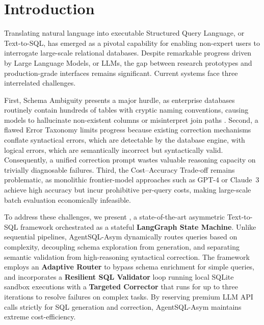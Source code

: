 \section{Introduction}
\label{sec:intro}

Translating natural language into executable Structured Query Language, or Text-to-SQL, has emerged as a pivotal capability for enabling non-expert users to interrogate large-scale relational databases. Despite remarkable progress driven by Large Language Models, or LLMs, the gap between research prototypes and production-grade interfaces remains significant. Current systems face three interrelated challenges.

First, Schema Ambiguity presents a major hurdle, as enterprise databases routinely contain hundreds of tables with cryptic naming conventions, causing models to hallucinate non-existent columns or misinterpret join paths \cite{li_can_2023, floratou2024broken}. Second, a flawed Error Taxonomy limits progress because existing correction mechanisms conflate syntactical errors, which are detectable by the database engine, with logical errors, which are semantically incorrect but syntactically valid. Consequently, a unified correction prompt wastes valuable reasoning capacity on trivially diagnosable failures. Third, the Cost--Accuracy Trade-off remains problematic, as monolithic frontier-model approaches such as GPT-4 or Claude~3 achieve high accuracy but incur prohibitive per-query costs, making large-scale batch evaluation economically infeasible.

To address these challenges, we present , a state-of-the-art asymmetric Text-to-SQL framework orchestrated as a stateful \textbf{LangGraph State Machine}. Unlike sequential pipelines, AgentSQL-Asym dynamically routes queries based on complexity, decoupling schema exploration from generation, and separating semantic validation from high-reasoning syntactical correction. The framework employs an \textbf{Adaptive Router} to bypass schema enrichment for simple queries, and incorporates a \textbf{Resilient SQL Validator} loop running local SQLite sandbox executions with a \textbf{Targeted Corrector} that runs for up to three iterations to resolve failures on complex tasks. By reserving premium LLM API calls strictly for SQL generation and correction, AgentSQL-Asym maintains extreme cost-efficiency.


